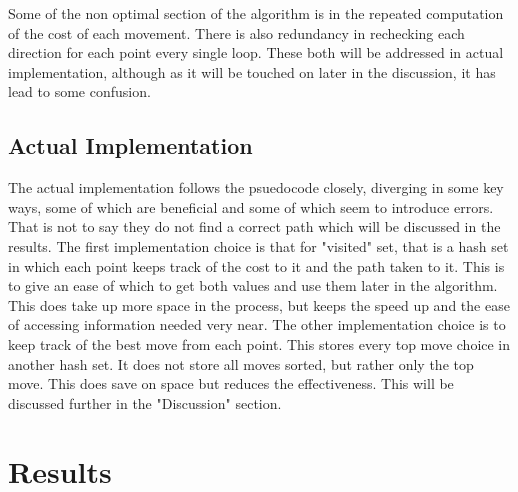 \documentclass[letterpaper, 10 pt, conference]{ieeeconf}   %
\begin{document}
Some of the non optimal section of the algorithm is in the repeated computation of the cost of each movement. There is also redundancy in rechecking each direction for each point every single loop. These both will be addressed in actual implementation, although as it will be touched on later in the discussion, it has lead to some confusion.



\subsection{Actual Implementation}

The actual implementation follows the psuedocode closely, diverging in some key ways, some of which are beneficial and some of which seem to introduce errors. That is not to say they do not find a correct path which will be discussed in the results. The first implementation choice is that for "visited" set, that is a hash set in which each point keeps track of the cost to it and the path taken to it. This is to give an ease of which to get both values and use them later in the algorithm. This does take up more space in the process, but keeps the speed up and the ease of accessing information needed very near. The other implementation choice is to keep track of the best move from each point. This stores every top move choice in another hash set. It does not store all moves sorted, but rather only the top move. This does save on space but reduces the effectiveness. This will be discussed further in the "Discussion" section.

\section{Results}
\end{document}
